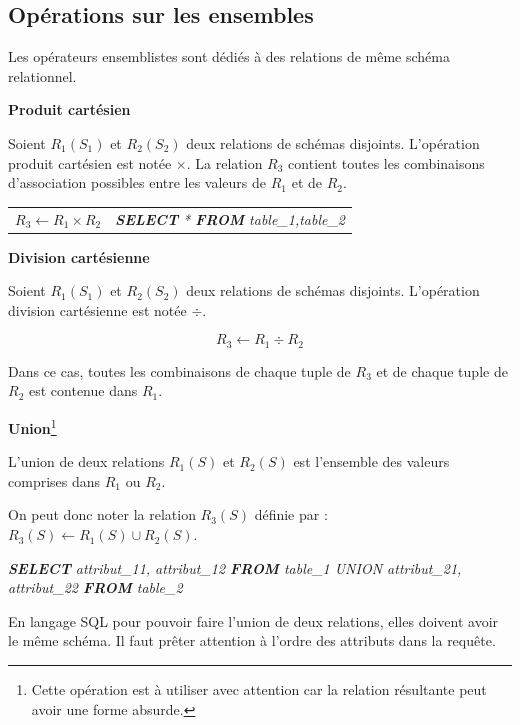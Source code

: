 \documentclass[10pt,fleqn]{article} %
\begin{document}
\subsection*{Opérations sur les ensembles}
Les opérateurs ensemblistes sont dédiés à des relations de même schéma relationnel. 

\begin{defi}

\textbf{Produit cartésien}

Soient $R_1(S_1)$ et $R_2(S_2)$ deux relations de schémas disjoints. L'opération produit cartésien est notée $\times$. La relation $R_3$ contient toutes les combinaisons d'association possibles entre les valeurs de $R_1$ et de $R_2$.

\begin{center}
\begin{tabular}{cc}
$R_3 \leftarrow R_1 \times R_2$ & 
\textsl{\textbf{SELECT} * \textbf{FROM} table\_1,table\_2}
\end{tabular}
\end{center}
\end{defi}


\begin{defi}

\textbf{Division cartésienne}

Soient $R_1(S_1)$ et $R_2(S_2)$ deux relations de schémas disjoints. L'opération division cartésienne est notée $\div$. 

$$
R_3 \leftarrow R_1 \div R_2
$$

Dans ce cas, toutes les combinaisons de chaque tuple de $R_3$ et de chaque tuple de $R_2$ est contenue dans $R_1$.

\end{defi}


\begin{defi}

\textbf{Union}\footnote{Cette opération est à utiliser avec attention car la relation résultante peut avoir une forme absurde.}

L'union de deux relations $R_1(S)$ et $R_2(S)$ est l'ensemble des valeurs comprises dans $R_1$ ou $R_2$. 

On peut donc noter la relation $R_3(S)$ définie par : $R_3(S)\leftarrow R_1(S)\cup R_2(S)$.

\textsl{\textbf{SELECT}  attribut\_11, attribut\_12 \textbf{FROM} table\_1 UNION attribut\_21, attribut\_22 \textbf{FROM} table\_2}

\footnotesize{En langage SQL pour pouvoir faire l'union de deux relations, elles doivent avoir le même schéma. Il faut prêter attention à l'ordre des attributs dans la requête. }
\end{defi}
\end{document}
